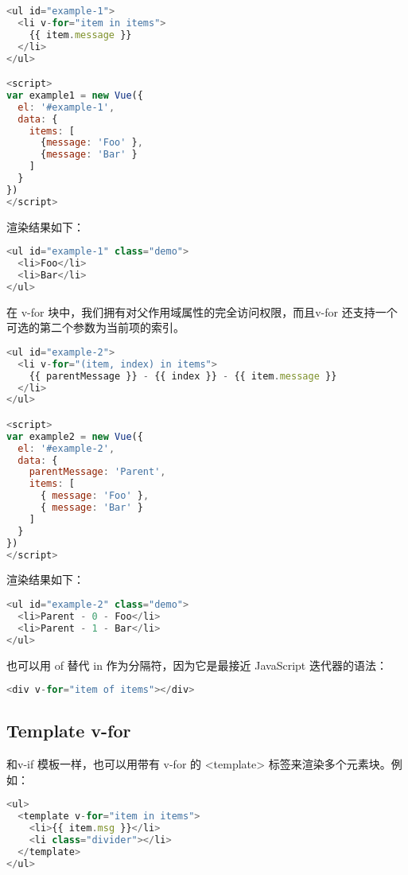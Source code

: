 \begin{lstlisting}[language=JavaScript]
<ul id="example-1">
  <li v-for="item in items">
    {{ item.message }}
  </li>
</ul>

<script>
var example1 = new Vue({
  el: '#example-1',
  data: {
    items: [
      {message: 'Foo' },
      {message: 'Bar' }
    ]
  }
})
</script>
\end{lstlisting}

渲染结果如下：


\begin{lstlisting}[language=JavaScript]
<ul id="example-1" class="demo">
  <li>Foo</li>
  <li>Bar</li>
</ul>
\end{lstlisting}


在 v-for 块中，我们拥有对父作用域属性的完全访问权限，而且v-for 还支持一个可选的第二个参数为当前项的索引。





\begin{lstlisting}[language=JavaScript]
<ul id="example-2">
  <li v-for="(item, index) in items">
    {{ parentMessage }} - {{ index }} - {{ item.message }}
  </li>
</ul>

<script>
var example2 = new Vue({
  el: '#example-2',
  data: {
    parentMessage: 'Parent',
    items: [
      { message: 'Foo' },
      { message: 'Bar' }
    ]
  }
})
</script>
\end{lstlisting}

渲染结果如下：

\begin{lstlisting}[language=JavaScript]
<ul id="example-2" class="demo">
  <li>Parent - 0 - Foo</li>
  <li>Parent - 1 - Bar</li>
</ul>
\end{lstlisting}

也可以用 of 替代 in 作为分隔符，因为它是最接近 JavaScript 迭代器的语法：

\begin{lstlisting}[language=JavaScript]
<div v-for="item of items"></div>
\end{lstlisting}


\subsection{Template v-for}


和v-if 模板一样，也可以用带有 v-for 的 <template> 标签来渲染多个元素块。例如：

\begin{lstlisting}[language=JavaScript]
<ul>
  <template v-for="item in items">
    <li>{{ item.msg }}</li>
    <li class="divider"></li>
  </template>
</ul>
\end{lstlisting}

